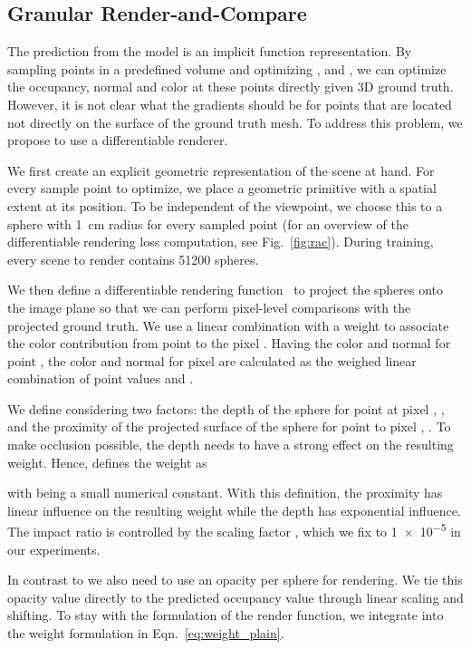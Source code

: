 \documentclass[10pt,twocolumn,letterpaper]{article}
\newcommand{\beforesubsection}{\vspace{0mm}}
\newcommand{\aftersubsection}{\vspace{0mm}}
\begin{document}
\beforesubsection
\subsection{Granular Render-and-Compare} \label{sec:rac}
\aftersubsection

The prediction from the model is an implicit function representation.
By sampling points in a predefined volume and optimizing ,  and , we can optimize the occupancy, normal and color at these points directly given 3D ground truth. However, it is not clear what the gradients should be for points that are located not directly on the surface of the ground truth mesh. To address this problem, we propose to use a differentiable renderer.


We first create an explicit geometric representation of the scene at hand.
For every sample point to optimize, we place a geometric primitive with a spatial extent at its position. 
To be independent of the viewpoint, we choose this to a sphere with \SI{1}{cm} radius for every sampled point (for an overview of the differentiable rendering loss computation, see Fig.~\ref{fig:rac}). During training, every scene to render contains \num{51200} spheres.

We then define a differentiable rendering function~\cite{liu2019softras} to project the spheres onto the image plane so that we can perform pixel-level comparisons with the projected ground truth. We use a linear combination with a weight  to associate the color contribution from point  to the pixel . Having the color  and normal  for point , the color and normal for pixel  are calculated as the weighed linear combination of point values  and .


We define  considering two factors: the depth of the sphere for point  at pixel , , and the proximity of the projected surface of the sphere for point  to pixel , . To make occlusion possible, the depth needs to have a strong effect on the resulting weight. Hence, \cite{liu2019softras} defines the weight as

with  being a small numerical constant. With this definition, the proximity has linear influence on the resulting weight while the depth has exponential influence. The impact ratio is controlled by the scaling factor , which we fix to \num{1e-5} in our experiments.

In contrast to \cite{liu2019softras} we also need to use an opacity  per sphere for rendering. We tie this opacity value  directly to the predicted occupancy value through linear scaling and shifting. To stay with the formulation of the render function, we integrate  into the weight formulation in Eqn.~\ref{eq:weight_plain}.
\end{document}
